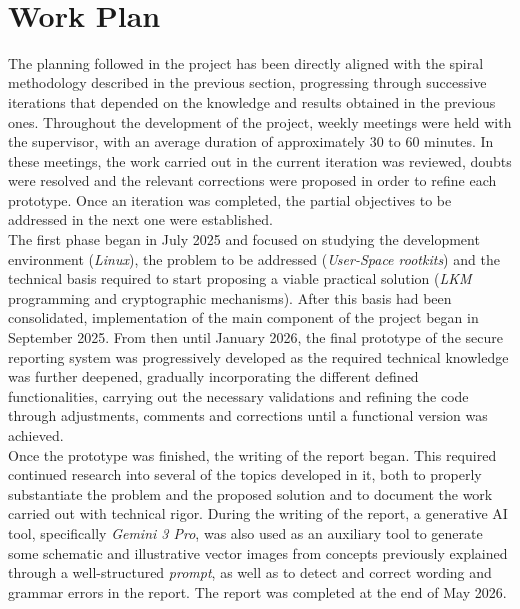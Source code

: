 \

\section{Work Plan}

The planning followed in the project has been directly aligned with the spiral methodology described in the previous section, progressing through successive iterations that depended on the knowledge and results obtained in the previous ones.
Throughout the development of the project, weekly meetings were held with the supervisor, with an average duration of approximately 30 to 60 minutes. In these meetings, the work carried out in the current iteration was reviewed, doubts were resolved and the relevant corrections were proposed in order to refine each prototype.
Once an iteration was completed, the partial objectives to be addressed in the next one were established.\\

The first phase began in July 2025 and focused on studying the development environment (\textit{Linux}), the problem to be addressed (\textit{User-Space rootkits}) and the technical basis required to start proposing a viable practical solution (\textit{LKM} programming and cryptographic mechanisms).
After this basis had been consolidated, implementation of the main component of the project began in September 2025.
From then until January 2026, the final prototype of the secure reporting system was progressively developed as the required technical knowledge was further deepened, gradually incorporating the different defined functionalities, carrying out the necessary validations and refining the code through adjustments, comments and corrections until a functional version was achieved.\\

Once the prototype was finished, the writing of the report began. This required continued research into several of the topics developed in it, both to properly substantiate the problem and the proposed solution and to document the work carried out with technical rigor.
During the writing of the report, a generative AI tool, specifically \textit{Gemini 3 Pro}, was also used as an auxiliary tool to generate some schematic and illustrative vector images from concepts previously explained through a well-structured \textit{prompt}, as well as to detect and correct wording and grammar errors in the report.
The report was completed at the end of May 2026.\\

